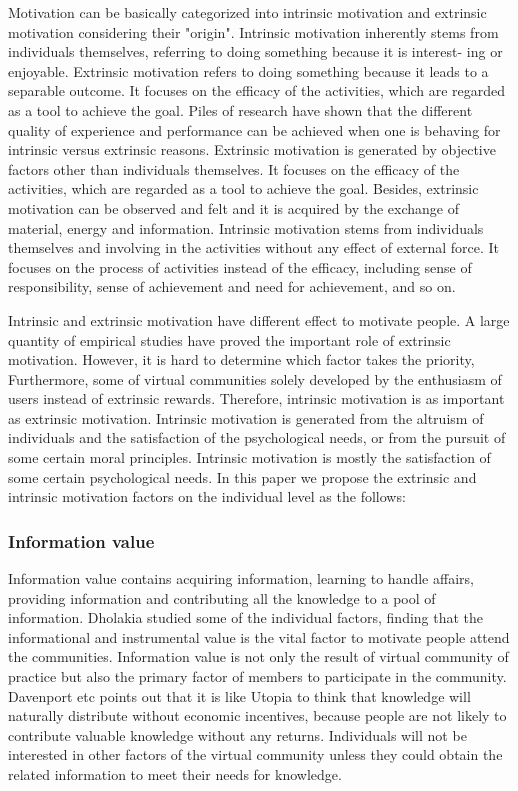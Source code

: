 \documentclass{elsarticle}
\begin{document}
Motivation can be basically categorized into intrinsic motivation and
extrinsic motivation considering their "origin". Intrinsic motivation
inherently  stems from individuals themselves, referring to doing something because it is interest-
ing or enjoyable. Extrinsic motivation refers to doing something
because it leads to a separable outcome.  It focuses on the efficacy
of the activities, which are regarded as a tool to achieve the goal. Piles of research have
shown that the different quality of experience and performance can be achieved
when one is behaving for intrinsic versus extrinsic
reasons\cite{Ryan200054}.  Extrinsic motivation is generated by
objective factors other than individuals themselves. It focuses on the
efficacy of the activities, which are regarded as a tool to achieve
the goal. Besides, extrinsic motivation can be observed and felt and
it is acquired by the exchange of material, energy and
information. Intrinsic motivation stems from individuals themselves
and involving in the activities without any effect of external
force. It focuses on the process of activities instead of the
efficacy, including sense of responsibility, sense of achievement and
need for achievement, and so on. 

Intrinsic and extrinsic motivation have different effect to motivate people\cite{deci1985ima}. A large quantity of empirical studies have proved the important role
of extrinsic motivation. However, it is hard to determine which factor
takes the priority, Furthermore, some of virtual communities solely 
developed by the enthusiasm of users instead of extrinsic
rewards. Therefore, intrinsic motivation is as important as extrinsic
motivation. Intrinsic motivation is generated from the altruism of
individuals and the satisfaction of the psychological needs, or from
the pursuit of some certain moral principles. Intrinsic motivation is
mostly the satisfaction of some certain psychological
needs\cite{josh_lerner_simple_2002}. In this paper we propose 
the extrinsic and intrinsic 
motivation factors on the individual level  as the
follows: 


\subsubsection{ Information value}

Information value contains acquiring
  information, learning to handle affairs, providing information and
  contributing all the knowledge to a pool of
  information\cite{flanagin2001internet}. Dholakia studied some of the individual factors, finding that the
informational and instrumental value is the vital
factor to motivate people attend the communities\cite{Dholakia2004241}. Information value is not only the result of
  virtual community of practice but also the primary factor of members
  to participate in the community. Davenport etc points out that it is like Utopia to think that
knowledge will naturally distribute without economic incentives,
because people are not likely to contribute valuable knowledge without
any returns\cite{davenport1998wko}. Individuals will not be interested
  in other factors of the virtual community unless they could obtain
  the related information to meet their needs for knowledge.
\end{document}
